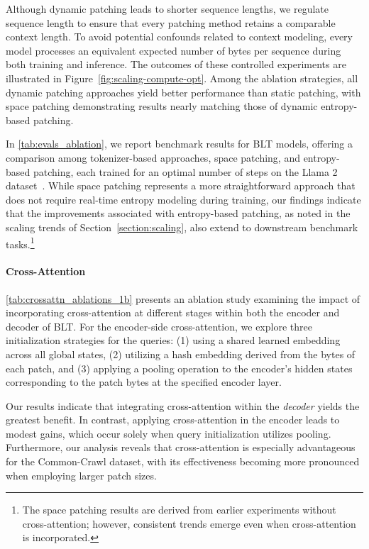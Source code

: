 Although dynamic patching leads to shorter sequence lengths, we regulate sequence length to ensure that every patching method retains a comparable context length. To avoid potential confounds related to context modeling, every model processes an equivalent expected number of bytes per sequence during both training and inference. The outcomes of these controlled experiments are illustrated in Figure~\ref{fig:scaling-compute-opt}. Among the ablation strategies, all dynamic patching approaches yield better performance than static patching, with space patching demonstrating results nearly matching those of dynamic entropy-based patching.

In \autoref{tab:evals_ablation}, we report benchmark results for {\textsc BLT} models, offering a comparison among tokenizer-based approaches, space patching, and entropy-based patching, each trained for an optimal number of steps on the Llama 2 dataset~\citep{dubey2024llama}. While space patching represents a more straightforward approach that does not require real-time entropy modeling during training, our findings indicate that the improvements associated with entropy-based patching, as noted in the scaling trends of Section~\ref{section:scaling}, also extend to downstream benchmark tasks.\footnote{The space patching results are derived from earlier experiments without cross-attention; however, consistent trends emerge even when cross-attention is incorporated.}

\paragraph{Cross-Attention} 
\autoref{tab:crossattn_ablations_1b} presents an ablation study examining the impact of incorporating cross-attention at different stages within both the encoder and decoder of {\textsc BLT}. For the encoder-side cross-attention, we explore three initialization strategies for the queries: (1) using a shared learned embedding across all global states, (2) utilizing a hash embedding derived from the bytes of each patch, and (3) applying a pooling operation to the encoder’s hidden states corresponding to the patch bytes at the specified encoder layer.

Our results indicate that integrating cross-attention within the \textit{decoder} yields the greatest benefit. In contrast, applying cross-attention in the encoder leads to modest gains, which occur solely when query initialization utilizes pooling. Furthermore, our analysis reveals that cross-attention is especially advantageous for the Common-Crawl dataset, with its effectiveness becoming more pronounced when employing larger patch sizes.

